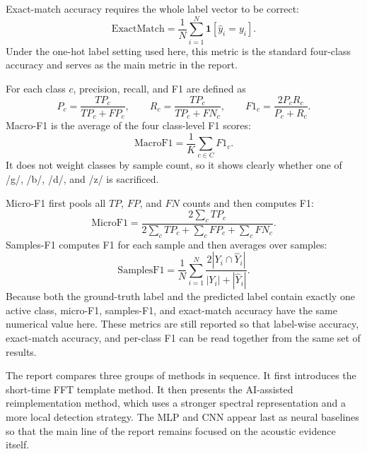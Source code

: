 Exact-match accuracy requires the whole label vector to be correct:
\[
\mathrm{ExactMatch}
=\frac{1}{N}\sum_{i=1}^{N}\mathbf{1}[\hat y_i=y_i].
\]
Under the one-hot label setting used here, this metric is the standard four-class accuracy and serves as the main metric in the report.

For each class $c$, precision, recall, and F1 are defined as
\[
P_c=\frac{TP_c}{TP_c+FP_c},\qquad
R_c=\frac{TP_c}{TP_c+FN_c},\qquad
F1_c=\frac{2P_cR_c}{P_c+R_c}.
\]
Macro-F1 is the average of the four class-level F1 scores:
\[
\mathrm{MacroF1}=\frac{1}{K}\sum_{c\in C}F1_c.
\]
It does not weight classes by sample count, so it shows clearly whether one of /g/, /b/, /d/, and /z/ is sacrificed.

Micro-F1 first pools all $TP$, $FP$, and $FN$ counts and then computes F1:
\[
\mathrm{MicroF1}
=\frac{2\sum_c TP_c}{2\sum_c TP_c+\sum_c FP_c+\sum_c FN_c}.
\]
Samples-F1 computes F1 for each sample and then averages over samples:
\[
\mathrm{SamplesF1}
=\frac{1}{N}\sum_{i=1}^{N}
\frac{2|Y_i\cap \hat Y_i|}{|Y_i|+|\hat Y_i|}.
\]
Because both the ground-truth label and the predicted label contain exactly one active class, micro-F1, samples-F1, and exact-match accuracy have the same numerical value here. These metrics are still reported so that label-wise accuracy, exact-match accuracy, and per-class F1 can be read together from the same set of results.

The report compares three groups of methods in sequence. It first introduces the short-time FFT template method. It then presents the AI-assisted reimplementation method, which uses a stronger spectral representation and a more local detection strategy. The MLP and CNN appear last as neural baselines so that the main line of the report remains focused on the acoustic evidence itself.
